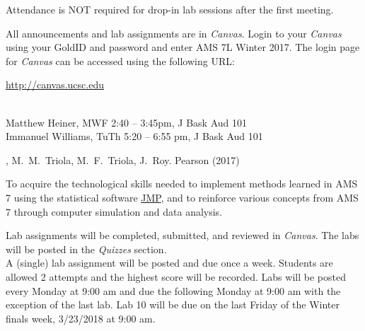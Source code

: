 \documentclass[11pt]{article}
\begin{document}
\noindent Attendance is NOT required for drop-in lab sessions after the first meeting. 
\vspace{0.15in}

 All announcements and lab assignments are in {\em Canvas}. Login to your {\em Canvas} using your GoldID and password and enter AMS 7L Winter 2017. 
The login page for {\em Canvas} can be accessed using the following URL: 
\begin{center}\url{http://canvas.ucsc.edu}\end{center} 

\vspace{0.3in}

 \\
Matthew Heiner, MWF 2:40 -- 3:45pm, J Bask Aud 101 \\
Immanuel Williams, TuTh 5:20 -- 6:55 pm, J Bask Aud 101

\vspace{.3in}


,
M.\ M.\ Triola, M.\ F.\ Triola, J.\ Roy. Pearson (2017)

\vspace{.3in}

 To acquire the technological skills
needed to implement methods learned in AMS 7 using the statistical
software \href{https://www.jmp.com/en_us/home.html}{JMP}, and to reinforce various concepts from AMS 7 through
computer simulation and data analysis.  \vspace{.2in}

 Lab assignments will be completed,
submitted, and reviewed in {\em Canvas}.  The labs will be posted in the
{\em Quizzes} section. \\
 
A (single) lab assignment will be posted and due once a week. Students are allowed 2 attempts and the highest score will be recorded. Labs will be posted every Monday at 9:00 am and due the following Monday at
9:00 am with the exception of the last lab. 
Lab 10 will be due on the last Friday of the Winter finals week, 3/23/2018 at 9:00 am. \\
\end{document}
